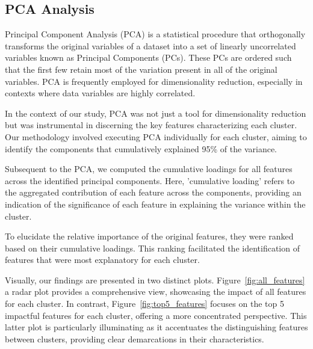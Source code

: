 \documentclass[12pt]{article}
\begin{document}
\subsection{PCA Analysis}

Principal Component Analysis (PCA) is a statistical procedure that orthogonally transforms the original variables of a dataset into a set of linearly uncorrelated variables known as Principal Components (PCs). These PCs are ordered such that the first few retain most of the variation present in all of the original variables. PCA is frequently employed for dimensionality reduction, especially in contexts where data variables are highly correlated.

In the context of our study, PCA was not just a tool for dimensionality reduction but was instrumental in discerning the key features characterizing each cluster. Our methodology involved executing PCA individually for each cluster, aiming to identify the components that cumulatively explained 95\% of the variance.

Subsequent to the PCA, we computed the cumulative loadings for all features across the identified principal components. Here, 'cumulative loading' refers to the aggregated contribution of each feature across the components, providing an indication of the significance of each feature in explaining the variance within the cluster.

To elucidate the relative importance of the original features, they were ranked based on their cumulative loadings. This ranking facilitated the identification of features that were most explanatory for each cluster.

Visually, our findings are presented in two distinct plots. 
Figure~\ref{fig:all_features} a radar plot provides a comprehensive view, showcasing the impact of all features for each cluster. 
In contrast, Figure~\ref{fig:top5_features} focuses on the top 5 impactful features for each cluster, offering a more concentrated perspective. This latter plot is particularly illuminating as it accentuates the distinguishing features between clusters, providing clear demarcations in their characteristics.
\newpage
\end{document}
